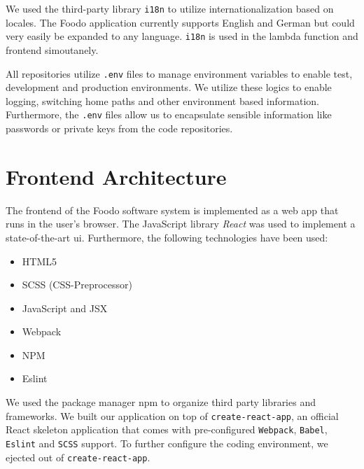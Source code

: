 
We used the third-party library \texttt{i18n} to utilize internationalization based on locales. The Foodo application currently supports English and German but could very easily be expanded to any language. \texttt{i18n} is used in the lambda function and frontend simoutanely. 


All repositories utilize \texttt{.env} files to manage environment variables to enable test, development and production environments. We utilize these logics to enable logging, switching home paths and other environment based information. Furthermore, the \texttt{.env} files allow us to encapsulate sensible information like passwords or private keys from the code repositories.

\section{Frontend Architecture}

The frontend of the Foodo software system is implemented as a web app that runs in the user’s browser. The JavaScript library \textit{React} was used to implement a state-of-the-art \gls{ui}. Furthermore, the following technologies have been used:

\begin{itemize}
		\itemsep-0.5em
	\item HTML5
	\item SCSS (CSS-Preprocessor)
	\item JavaScript and JSX
	\item Webpack 
	\item NPM
	\item Eslint
\end{itemize}

We used the package manager \gls{npm} to organize third party libraries and frameworks. We built our application on top of \texttt{create-react-app}, an official React skeleton application that comes with pre-configured \texttt{Webpack}, \texttt{Babel}, \texttt{Eslint} and \texttt{SCSS} support. To further configure the coding environment, we ejected out of \texttt{create-react-app}.


